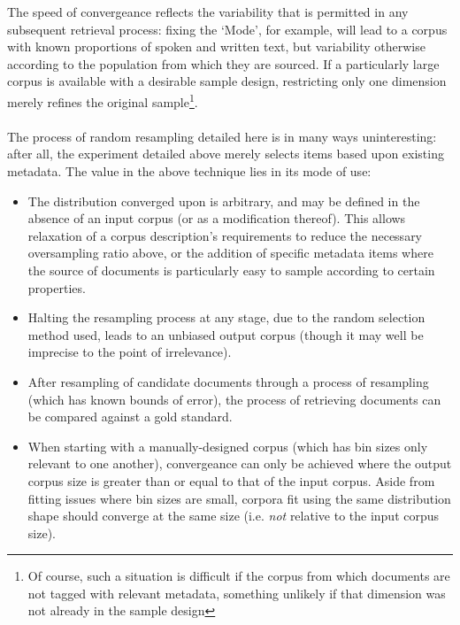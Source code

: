 The speed of convergeance reflects the variability that is permitted in any subsequent retrieval process: fixing the `Mode', for example, will lead to a corpus with known proportions of spoken and written text, but variability otherwise according to the population from which they are sourced.  If a particularly large corpus is available with a desirable sample design, restricting only one dimension merely refines the original sample\footnote{Of course, such a situation is difficult if the corpus from which documents are not tagged with relevant metadata, something unlikely if that dimension was not already in the sample design}.

\paragraph{}

The process of random resampling detailed here is in many ways uninteresting: after all, the experiment detailed above merely selects items based upon existing metadata.  The value in the above technique lies in its mode of use:

\begin{itemize}
    \item The distribution converged upon is arbitrary, and may be defined in the absence of an input corpus (or as a modification thereof).  This allows relaxation of a corpus description's requirements to reduce the necessary oversampling ratio above, or the addition of specific metadata items where the source of documents is particularly easy to sample according to certain properties.
    \item Halting the resampling process at any stage, due to the random selection method used, leads to an unbiased output corpus (though it may well be imprecise to the point of irrelevance).
    \item After resampling of candidate documents through a process of resampling (which has known bounds of error), the process of retrieving documents can be compared against a gold standard.
    \item When starting with a manually-designed corpus (which has bin sizes only relevant to one another), convergeance can only be achieved where the output corpus size is greater than or equal to that of the input corpus.  Aside from fitting issues where bin sizes are small, corpora fit using the same distribution shape should converge at the same size (i.e. \textsl{not} relative to the input corpus size).

\end{itemize}


